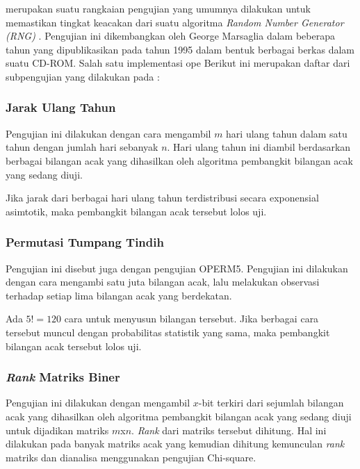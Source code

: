\documentclass[conference]{IEEEtran}
\newcommand{\en}[1]
    {\foreignlanguage{english}{\textit{#1}}}
\begin{document}
 merupakan suatu rangkaian pengujian yang umumnya dilakukan untuk memastikan tingkat keacakan dari suatu algoritma \en{Random Number Generator (RNG)} \cite{alani2010testing}.
Pengujian ini dikembangkan oleh George Marsaglia dalam beberapa tahun yang dipublikasikan pada tahun 1995 dalam bentuk berbagai berkas dalam suatu CD-ROM. \cite{marsaglia1998diehard}
Salah satu implementasi ope
Berikut ini merupakan daftar dari subpengujian yang dilakukan pada  \cite{brown2013dieharder}:

\subsubsection{Jarak Ulang Tahun}
\label{sec:teori:diehard:birthday}

Pengujian ini dilakukan dengan cara mengambil $m$ hari ulang tahun dalam satu tahun dengan jumlah hari sebanyak $n$.
Hari ulang tahun ini diambil berdasarkan berbagai bilangan acak yang dihasilkan oleh algoritma pembangkit bilangan acak yang sedang diuji.

Jika jarak dari berbagai hari ulang tahun terdistribusi secara exponensial asimtotik, maka pembangkit bilangan acak tersebut lolos uji.

\subsubsection{Permutasi Tumpang Tindih}

Pengujian ini disebut juga dengan pengujian OPERM5.
Pengujian ini dilakukan dengan cara mengambi satu juta bilangan acak, lalu melakukan observasi terhadap setiap lima bilangan acak yang berdekatan.

Ada $5! = 120$ cara untuk menyusun bilangan tersebut.
Jika berbagai cara tersebut muncul dengan probabilitas statistik yang sama, maka pembangkit bilangan acak tersebut lolos uji.

\subsubsection{\en{Rank} Matriks Biner}

Pengujian ini dilakukan dengan mengambil $x$-bit terkiri dari sejumlah bilangan acak yang dihasilkan oleh algoritma pembangkit bilangan acak yang sedang diuji untuk dijadikan matriks $m$x$n$.
\en{Rank} dari matriks tersebut dihitung.
Hal ini dilakukan pada banyak matriks acak yang kemudian dihitung kemunculan \en{rank} matriks dan dianalisa menggunakan pengujian Chi-square.
\end{document}
